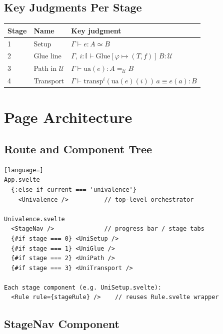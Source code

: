 \documentclass[11pt,a4paper]{article}
\begin{document}
\subsection{Key Judgments Per Stage}

\begin{center}
\begin{tabular}{llp{7cm}}
\toprule
\textbf{Stage} & \textbf{Name} & \textbf{Key judgment} \\
\midrule
1 & Setup      & $\Gamma \vdash e : A \simeq B$ \\
2 & Glue line  & $\Gamma,\, i{:}\mathbb{I} \vdash
                  \mathrm{Glue}[\varphi \mapsto (T,f)]\,B : \mathcal{U}$ \\
3 & Path in $\mathcal{U}$ &
                  $\Gamma \vdash \mathrm{ua}(e) : A =_{\mathcal{U}} B$ \\
4 & Transport  & $\Gamma \vdash \mathrm{transp}^i(\mathrm{ua}(e)(i))\,a
                  \equiv e(a) : B$ \\
\bottomrule
\end{tabular}
\end{center}

\section{Page Architecture}

\subsection{Route and Component Tree}

\begin{lstlisting}[language=]
App.svelte
  {:else if current === 'univalence'}
    <Univalence />          // top-level orchestrator

Univalence.svelte
  <StageNav />              // progress bar / stage tabs
  {#if stage === 0} <UniSetup />
  {#if stage === 1} <UniGlue />
  {#if stage === 2} <UniPath />
  {#if stage === 3} <UniTransport />

Each stage component (e.g. UniSetup.svelte):
  <Rule rule={stageRule} />    // reuses Rule.svelte wrapper
\end{lstlisting}

\subsection{StageNav Component}
\end{document}
